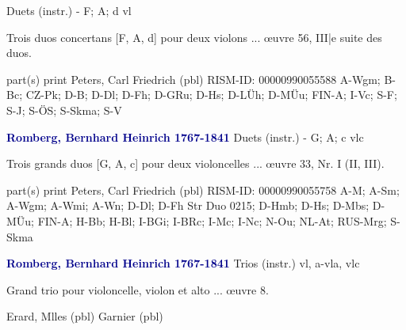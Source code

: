 \documentclass[twocolumn]{book}
\begin{document}
\newline Duets (instr.) - F; A; d
 vl
\newline \begin{itshape}Trois duos concertans [F, A, d] pour deux violons ... œuvre 56, III|e suite des duos.\end{itshape} 
\newline \textcolor{darkblue}{}  part(s)
\newline print
\newline Peters, Carl Friedrich  (pbl)
\newline RISM-ID: 00000990055588
\newline A-Wgm; B-Bc; CZ-Pk; D-B; D-Dl; D-Fh; D-GRu; D-Hs; D-LÜh; D-MÜu; FIN-A; I-Vc; S-F; S-J; S-ÖS; S-Skma; S-V
\newline \par \vspace{7pt} \textcolor{darkblue}{\textbf{Romberg, Bernhard Heinrich  1767-1841}}
\newline Duets (instr.) - G; A; c
 vlc
\newline \begin{itshape}Trois grands duos [G, A, c] pour deux violoncelles ... œuvre 33, Nr. I (II, III).\end{itshape} 
\newline \textcolor{darkblue}{}  part(s)
\newline print
\newline Peters, Carl Friedrich  (pbl)
\newline RISM-ID: 00000990055758
\newline A-M; A-Sm; A-Wgm; A-Wmi; A-Wn; D-Dl; D-Fh  Str Duo 0215; D-Hmb; D-Hs; D-Mbs; D-MÜu; FIN-A; H-Bb; H-Bl; I-BGi; I-BRc; I-Mc; I-Nc; N-Ou; NL-At; RUS-Mrg; S-Skma
\newline \par \vspace{7pt} \textcolor{darkblue}{\textbf{Romberg, Bernhard Heinrich  1767-1841}}
\newline Trios (instr.)
\newline vl, a-vla, vlc
\newline \begin{itshape}Grand trio pour violoncelle, violon et alto ... œuvre 8.\end{itshape} 
\newline Erard, Mlles  (pbl)
\newline Garnier  (pbl)
\end{document}
